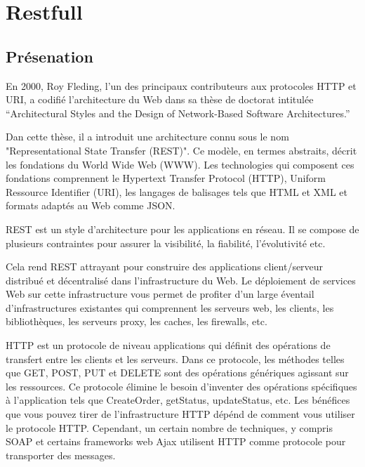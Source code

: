 \section{Restfull}
\label{ch:restfull}

\subsection{Présenation}

En 2000, Roy Fleding, l’un des principaux contributeurs aux protocoles HTTP et URI, a codifié l’architecture du Web dans sa thèse de doctorat intitulée “Architectural Styles and the Design of Network-Based Software Architectures.”

Dan cette thèse, il a introduit une architecture connu sous le nom "Representational State Transfer (REST)". Ce modèle, en termes abstraits, décrit les fondations du World Wide Web (WWW). Les technologies qui composent ces fondations comprennent le Hypertext Transfer Protocol (HTTP), Uniform Ressource Identifier (URI), les langages de balisages tels que HTML et XML et formats adaptés au Web comme JSON.

REST est un style d’architecture pour les applications en réseau. Il se compose de plusieurs contraintes pour assurer la visibilité, la fiabilité, l'évolutivité etc.

Cela rend REST attrayant pour construire des applications client/serveur distribué et décentralisé dans l'infrastructure du Web. Le déploiement de services Web sur cette infrastructure vous permet de profiter d’un large éventail d'infrastructures existantes qui comprennent les serveurs web, les clients, les bibliothèques, les serveurs proxy, les caches, les firewalls, etc.

HTTP est un protocole de niveau applications qui définit des opérations de transfert entre les clients et les serveurs. Dans ce protocole, les méthodes telles que GET, POST, PUT et DELETE sont des opérations génériques agissant sur les ressources. Ce protocole élimine le besoin d'inventer des opérations spécifiques à l’application tels que CreateOrder, getStatus, updateStatus, etc. Les bénéfices que vous pouvez tirer de l'infrastructure HTTP dépénd de comment vous utiliser le protocole HTTP. Cependant, un certain nombre de techniques, y compris SOAP et certains frameworks web Ajax utilisent HTTP comme protocole pour transporter des messages. 

